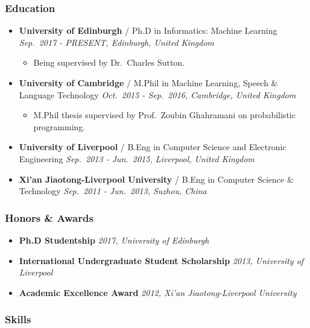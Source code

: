 \documentclass[11pt, a4paper]{article}
\providecommand{\tightlist}{%
  \setlength{\itemsep}{0pt}\setlength{\parskip}{0pt}}
\begin{document}
\begin{raggedright}
\subsubsection{Education}

\begin{itemize}
\tightlist
\item
  \textbf{University of Edinburgh} / Ph.D in Informatics: Machine
  Learning \emph{Sep.~2017 - PRESENT, Edinburgh, United Kingdom}

  \begin{itemize}
  \tightlist
  \item
    Being supervised by Dr.~Charles Sutton.
  \end{itemize}
\item
  \textbf{University of Cambridge} / M.Phil in Machine Learning, Speech
  \& Language Technology \emph{Oct.~2015 - Sep.~2016, Cambridge, United
  Kingdom}

  \begin{itemize}
  \tightlist
  \item
    M.Phil thesis supervised by Prof.~Zoubin Ghahramani on probabilistic
    programming.
  \end{itemize}
\item
  \textbf{University of Liverpool} / B.Eng in Computer Science and
  Electronic Engineering \emph{Sep.~2013 - Jun.~2015, Liverpool, United
  Kingdom}
\item
  \textbf{Xi'an Jiaotong-Liverpool University} / B.Eng in Computer
  Science \& Technology \emph{Sep.~2011 - Jun.~2013, Suzhou, China}
\end{itemize}

\subsubsection{Honors \& Awards}

\begin{itemize}
\tightlist
\item
  \textbf{Ph.D Studentship} \emph{2017, University of Edinburgh}
\item
  \textbf{International Undergraduate Student Scholarship} \emph{2013,
  University of Liverpool}
\item
  \textbf{Academic Excellence Award} \emph{2012, Xi'an
  Jiaotong-Liverpool University}
\end{itemize}

\subsubsection{Skills}


\end{raggedright}
\end{document}

